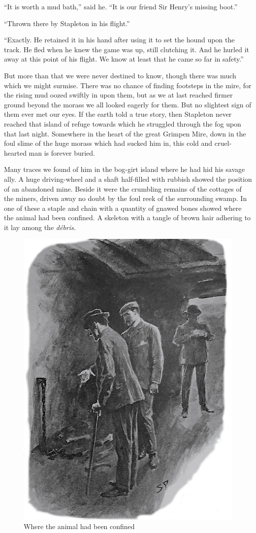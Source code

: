 \documentclass[paper=5.5in:8.5in,BCOR=7mm,twoside,DIV=calc,12pt,usegeometry,openany,chapterprefix,endperiod]{scrbook} %
\begin{document}
\enquote{It is worth a mud bath,} said he. \enquote{It is our friend Sir Henry's missing boot.}

\enquote{Thrown there by Stapleton in his flight.}

\enquote{Exactly. He retained it in his hand after using it to set the hound upon the track. He fled when he knew the game was up, still clutching it. And he hurled it away at this point of his flight. We know at least that he came so far in safety.}

But more than that we were never destined to know, though there was much which we might surmise. There was no chance of finding footsteps in the mire, for the rising mud oozed swiftly in upon them, but as we at last reached firmer ground beyond the morass we all looked eagerly for them. But no slightest sign of them ever met our eyes. If the earth told a true story, then Stapleton never reached that island of refuge towards which he struggled through the fog upon that last night. Somewhere in the heart of the great Grimpen Mire, down in the foul slime of the huge morass which had sucked him in, this cold and cruel-hearted man is forever buried.

Many traces we found of him in the bog-girt island where he had hid his savage ally. A huge driving-wheel and a shaft half-filled with rubbish showed the position of an abandoned mine. Beside it were the crumbling remains of the cottages of the miners, driven away no doubt by the foul reek of the surrounding swamp. In one of these a staple and chain with a quantity of gnawed bones showed where the animal had been confined. A skeleton with a tangle of brown hair adhering to it lay among the \textit{débris.}

\begin{figure}[tbph]
\centering
\includegraphics[width=0.8\linewidth]{14_creatureconfined}
\caption{Where the animal had been confined}
\end{figure}
\end{document}
